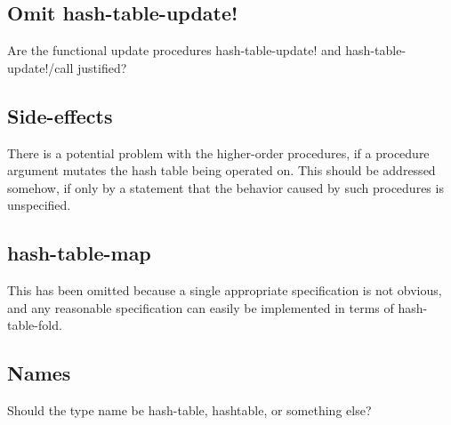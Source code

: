 \documentclass[twoside]{algol60}
\begin{document}
\subsection{Omit hash-table-update!}
Are the functional update procedures {\cf hash-table-update!} and 
{\cf hash-table-update!/call} justified?

\subsection{Side-effects}
There is a potential problem with the higher-order procedures, if a procedure argument mutates the hash table being operated on.  This should be addressed somehow, if only by a statement that the behavior caused by such procedures is unspecified.

\subsection{hash-table-map}
This has been omitted because a single appropriate specification is not obvious, and any reasonable specification can easily be implemented in terms of {\cf hash-table-fold}.

\subsection{Names}
Should the type name be {\cf hash-table}, {\cf hashtable}, or something else?


\end{document}
